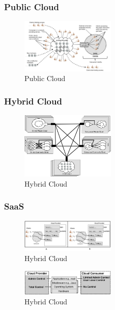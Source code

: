 \subsubsection{Public Cloud}
\begin{figure}[H]
    \centering
	\includegraphics[width=0.4\textwidth]{Images/PublicCloud}
	\caption{Public Cloud \cite{Badger}}
	\label{PublicCloud}
\end{figure}


\subsubsection{Hybrid Cloud}
\begin{figure}[H]
    \centering
	\includegraphics[width=0.4\textwidth]{Images/HybridCloud}
	\caption{Hybrid Cloud \cite{Badger}}
	\label{HybridCloud}
\end{figure}


\subsubsection{SaaS}
\begin{figure}[H]
    \centering
	\includegraphics[width=0.4\textwidth]{Images/SaaSInteraction}
	\caption{Hybrid Cloud \cite{Badger}}
	\label{SaaSInteraction}
\end{figure}

\begin{figure}[H]
    \centering
	\includegraphics[width=0.4\textwidth]{Images/SaaSControl}
	\caption{Hybrid Cloud \cite{Badger}}
	\label{SaaSControl}
\end{figure}


